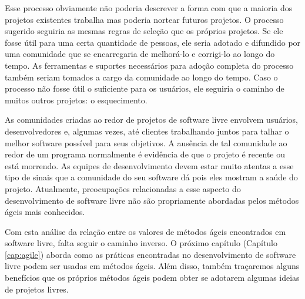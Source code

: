 Esse processo obviamente não poderia descrever a forma com que a
maioria dos projetos existentes trabalha mas poderia nortear futuros
projetos. O processo sugerido seguiria as mesmas regras de seleção que
os próprios projetos. Se ele fosse útil para uma certa quantidade de
pessoas, ele seria adotado e difundido por uma comunidade que se
encarregaria de melhorá-lo e corrigi-lo ao longo do tempo. As
ferramentas e suportes necessários para adoção completa do processo
também seriam tomados a cargo da comunidade ao longo do tempo. Caso o
processo não fosse útil o suficiente para os usuários, ele seguiria o
caminho de muitos outros projetos: o esquecimento.

As comunidades criadas ao redor de projetos de software livre envolvem
usuários, desenvolvedores e, algumas vezes, até clientes trabalhando
juntos para talhar o melhor software possível para seus objetivos. A
ausência de tal comunidade ao redor de um programa normalmente é
evidência de que o projeto é recente ou está morrendo. As equipes de
desenvolvimento devem estar muito atentas a esse tipo de sinais que a
comunidade do seu software dá pois eles mostram a saúde do
projeto. Atualmente, preocupações relacionadas a esse aspecto do
desenvolvimento de software livre não são propriamente abordadas pelos
métodos ágeis mais conhecidos.

Com esta análise da relação entre os valores de métodos ágeis
encontrados em software livre, falta seguir o caminho inverso. O
próximo capítulo (Capítulo \ref{cap:agile}) aborda como as práticas
encontradas no desenvolvimento de software livre podem ser usadas em
métodos ágeis. Além disso, também traçaremos alguns benefícios que os
próprios métodos ágeis podem obter se adotarem algumas ideias de
projetos livres.
